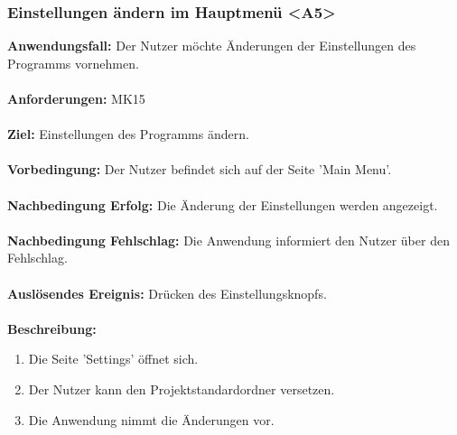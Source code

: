 \documentclass[parskip=full]{scrartcl} %
\begin{document}
\subsubsection*{Einstellungen ändern im Hauptmenü <A5>}
\textbf{Anwendungsfall:} Der Nutzer möchte Änderungen der Einstellungen des Programms vornehmen. \\\\
\textbf{Anforderungen:} MK15\\\\
\textbf{Ziel:} Einstellungen des Programms ändern.\\\\
\textbf{Vorbedingung:}  Der Nutzer befindet sich auf der Seite 'Main Menu'.  \\\\
\textbf{Nachbedingung Erfolg:} Die Änderung der Einstellungen werden angezeigt.\\\\
\textbf{Nachbedingung Fehlschlag:} Die Anwendung informiert den Nutzer über den Fehlschlag.\\\\
\textbf{Auslösendes Ereignis:} Drücken des Einstellungsknopfs. \\\\
\textbf{Beschreibung:}
\begin{enumerate}
    \item Die Seite 'Settings' öffnet sich.
    \item Der Nutzer kann den Projektstandardordner versetzen.
    \item Die Anwendung nimmt die Änderungen vor.
\end{enumerate}
\newpage
\end{document}
